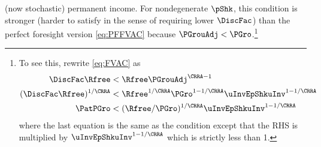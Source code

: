\documentclass[BufferStockTheory]{subfiles}
\begin{document}
(now stochastic) permanent income.  For nondegenerate $\pShk$, this 
condition is stronger
(harder to satisfy in the sense of requiring lower $\DiscFac$) than
the perfect foresight version \eqref{eq:PFFVAC} because $\PGrouAdj <
\PGro$.\footnote{To see this, rewrite \eqref{eq:FVAC} as 
\begin{align*}
  \DiscFac \Rfree & < \Rfree \PGrouAdj^{\CRRA-1}
  \\ (\DiscFac \Rfree)^{1/\CRRA}  & < \Rfree^{1/\CRRA} \PGro^{1-1/\CRRA} \uInvEpShkuInv^{1-1/\CRRA}
  \\ \PatPGro & < (\Rfree/\PGro)^{1/\CRRA} \uInvEpShkuInv^{1-1/\CRRA}
\end{align*}
where the last equation is the same as the {\PFFVAC} condition except that the 
RHS is multiplied by $\uInvEpShkuInv^{1-1/\CRRA}$ which is strictly less than 1.}

\begin{comment}
  A useful alternative version is
  \begin{verbatimwrite}{\EqDir/FVACAlt}
    \begin{equation}\begin{gathered}\begin{aligned}
      \DiscFac \Rfree \PGro^{-\CRRA} \uInvEpShkuInv^{1-\CRRA}   & < \Rfree/\PGro \nonumber
      \\ \PatPGro \uInvEpShkuInv^{1/\CRRA-1}  & < (\Rfree/\PGro)^{1/\CRRA} \label{eq:FVACAlt}.
    \end{aligned}\end{gathered}\end{equation}
  \end{verbatimwrite}
  
\end{comment}

\begin{comment}
  In the case where the permanent shocks are lognormally distributed, we have
  \begin{equation}\begin{gathered}\begin{aligned}
    \Ex[\pshk^{1-\CRRA}] & = &\exp((1-\CRRA)(-\sigma^{2}_{\pshk}/2)+(1-\CRRA)^{2}\sigma_{\pshk}^{2})
    \\  & = \exp((1-\CRRA)((-1/2)+(1-\CRRA))\sigma_{\pshk}^{2})
    \\  & = \exp((1-\CRRA)(1/2-\CRRA)\sigma_{\pshk}^{2})
  \end{aligned}\end{gathered}\end{equation}
\end{comment}
\end{document}
